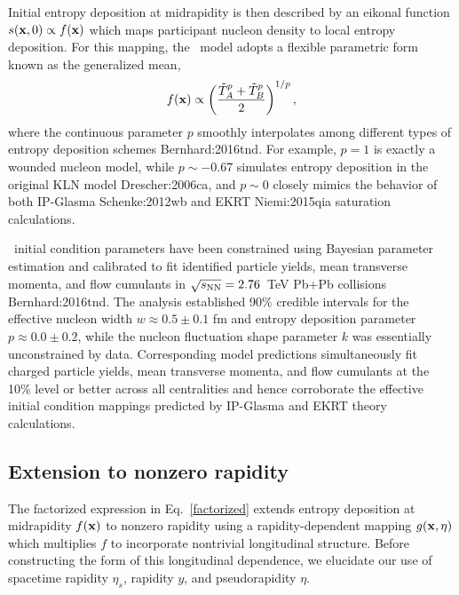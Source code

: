 Initial entropy deposition at midrapidity is then described by an eikonal function $s(\mathbf x, 0) \propto f(\mathbf x)$ which maps participant nucleon density to local entropy deposition.
For this mapping, the \trento\ model adopts a flexible parametric form known as the generalized mean,
\begin{equation}
  \label{gen_mean}
        f(\mathbf x) \propto \left( \frac{\tilde{T}_A^p + \tilde{T}_B^p}{2} \right)^{1/p},
\end{equation}
where the continuous parameter $p$ smoothly interpolates among different types of entropy deposition schemes {Bernhard:2016tnd}.
For example, $p=1$ is exactly a wounded nucleon model, while $p\sim-0.67$ simulates entropy deposition in the original KLN model {Drescher:2006ca}, and $p \sim 0$ closely mimics the behavior of both IP-Glasma {Schenke:2012wb} and EKRT {Niemi:2015qia} saturation calculations.

\trento\ initial condition parameters have been constrained using Bayesian parameter estimation and calibrated to fit identified particle yields, mean transverse momenta, and flow cumulants in ${\sqrt{s_\mathrm{NN}}=2.76}$~TeV Pb+Pb collisions {Bernhard:2016tnd}.
The analysis established 90\% credible intervals for the effective nucleon width {$w \approx 0.5 \pm 0.1$ fm} and entropy deposition parameter ${p \approx 0.0 \pm 0.2}$, while the nucleon fluctuation shape parameter $k$ was essentially unconstrained by data.
Corresponding model predictions simultaneously fit charged particle yields, mean transverse momenta, and flow cumulants at the 10\% level or better across all centralities and hence corroborate the effective initial condition mappings predicted by IP-Glasma and EKRT theory calculations.


\subsection{Extension to nonzero rapidity}

The factorized expression in Eq.~\eqref{factorized} extends entropy deposition at midrapidity $f(\mathbf x)$ to nonzero rapidity using a rapidity-dependent mapping $g(\mathbf x, \eta)$ which multiplies $f$ to incorporate nontrivial longitudinal structure.
Before constructing the form of this longitudinal dependence, we elucidate our use of spacetime rapidity $\eta_s$, rapidity $y$, and pseudorapidity $\eta$.

